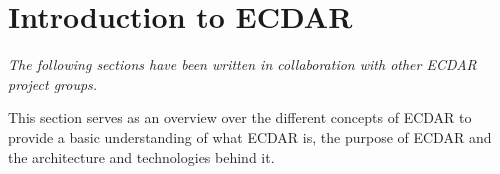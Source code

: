 

\section{Introduction to ECDAR}
\textit{The following sections have been written in collaboration with other ECDAR
project groups.}

This section serves as an overview over the different concepts of ECDAR to provide a basic understanding of what ECDAR is, the purpose of ECDAR and the architecture and technologies behind it.

